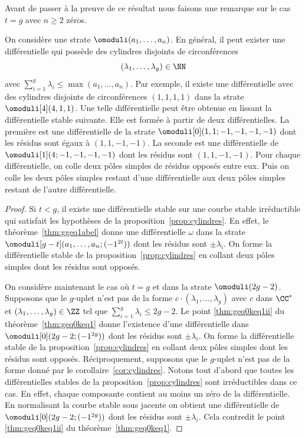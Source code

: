 Avant de passer à la preuve de ce résultat nous faisons une remarque sur le cas $t=g$ avec $n\geq2$ zéros.
\begin{rem}
On considère une strate $\omoduli(a_{1},\dots,a_{n})$. En général, il peut exister une différentielle qui possède des cylindres disjoints de circonférences
\[
(\lambda_{1},\dots,\lambda_{g})\in \NN
\]
avec $\sum_{i=1}^{g} \lambda_{i} \leq \max (a_{1},\dots,a_{n})$. Par exemple, il existe une différentielle avec des cylindres disjoints de circonférences $(1,1,1,1)$ dans la strate $\omoduli[4](4,1,1)$. Une telle différentielle peut être obtenue en lissant la différentielle stable suivante. Elle est formée à partir de deux différentielles. La première est une différentielle de la strate $\omoduli[0](1,1;-1,-1,-1,-1)$ dont les résidus sont égaux à $(1,1,-1,-1)$. La seconde est une différentielle de $\omoduli[1](4;-1,-1,-1,-1)$ dont les résidus sont $(1,1,-1,-1)$. Pour chaque différentielle, on colle deux pôles simples de résidus opposés entre eux. Puis on colle les deux pôles simples restant d'une différentielle aux deux pôles simples restant de l'autre différentielle.
\end{rem}

\begin{proof}
Si $t<g$, il existe une différentielle stable sur une courbe stable irréductible qui satisfait les hypothèses de la proposition~\ref{prop:cylindres}. En effet, le théorème~\ref{thm:ggeq1abel} donne une différentielle $\omega$ dans la strate $\omoduli[g-t](a_{1},\dots,a_{n};(-1^{2t}))$ dont les résidus sont $\pm \lambda_{i}$. On forme la différentielle stable de la proposition~\ref{prop:cylindres} en collant deux pôles simples dont les résidus sont opposés.

On considère maintenant le cas où $t=g$ et dans la strate $\omoduli(2g-2)$. Supposons que le $g$-uplet n'est pas de la forme $c \cdot (\lambda_{1},\dots, \lambda_{g})$ avec $c$ dans $\CC^{\ast}$ et $(\lambda_{1},\dots,\lambda_{g})\in \ZZ$ tel que $\sum_{i=1}^{g} \lambda_{i} \leq 2g-2$. Le point \eqref{thm:geq0keq1ii} du théorème~\ref{thm:geq0keq1} donne l'existence d'une différentielle dans $\omoduli[0](2g-2;(-1^{2g}))$ dont les résidus sont $\pm \lambda_{i}$. On forme la différentielle stable de la proposition~\ref{prop:cylindres} en collant deux pôles simples dont les résidus sont opposés. Réciproquement, supposons que le $g$-uplet n'est pas de la forme donné par le corollaire~\ref{cor:cylindres}. Notons tout d'abord que toutes les différentielles stables de la proposition~\ref{prop:cylindres} sont irréductibles dans ce cas. En effet, chaque composante contient au moins un zéro de la différentielle. En normalisant la courbe stable sous jacente on obtient une différentielle de $\omoduli[0](2g-2;(-1^{2g}))$ dont les résidus sont $\pm \lambda_{i}$. Cela contredit le point \eqref{thm:geq0keq1ii} du théorème~\ref{thm:geq0keq1}.
\end{proof}

